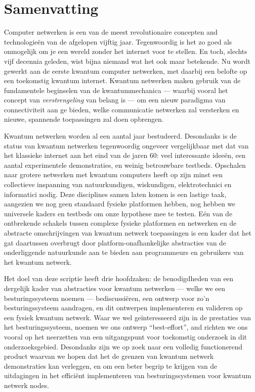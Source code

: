 \chapter*{Samenvatting}

{

Computer netwerken is een van de meest revolutionaire concepten and technologieën van de afgelopen
vijftig jaar. Tegenwoordig is het zo goed als onmogelijk om je een wereld zonder het internet voor
te stellen. En toch, slechts vijf decennia geleden, wist bijna niemand wat het ook maar betekende.
Nu wordt gewerkt aan de eerste kwantum computer netwerken, met daarbij een belofte op een toekomstig
kwantum internet. Kwantum netwerken maken gebruik van de fundamentele beginselen van de
kwantummechanica --- waarbij vooral het concept van \emph{verstrengeling} van belang is --- om een
nieuw paradigma van connectiviteit aan ge bieden, welke communicatie netwerken zal versterken en
nieuwe, spannende toepassingen zal doen opbrengen.

Kwantum netwerken worden al een aantal jaar bestudeerd. Desondanks is de status van kwantum
netwerken tegenwoordig ongeveer vergelijkbaar met dat van het klassieke internet aan het eind van de
jaren 60: veel interessante ideeën, een aantal experimentele demonstraties, en weinig betrouwbare
testbeds. Opschalen naar grotere netwerken met kwantum computers heeft op zijn minst een collectieve
inspanning van natuurkundigen, wiskundigen, elektrotechnici en informatici nodig. Deze disciplines
samen laten komen is een lastige taak, aangezien we nog geen standaard fysieke platformen hebben,
nog hebben we universele kaders en testbeds om onze hypothese mee te testen. Eén van de ontbrekende
schakels tussen complexe fysieke platformen en netwerken en de abstracte omschrijvingen van kwantum
netwerk toepassingen is een kader dat het gat daartussen overbrugt door platform-onafhankelijke
abstracties van de onderliggende natuurkunde aan te bieden aan programmeurs en gebruikers van het
kwantum netwerk.

Het doel van deze scriptie heeft drie hoofdzaken: de benodigdheden van een dergelijk kader van
abstracties voor kwantum netwerken --- welke we een besturingssysteem noemen --- bediscussiëren, een
ontwerp voor zo'n besturingssysteem aandragen, en dit ontwerpen implementeren en valideren op een
fysiek kwantum netwerk. Waar we wel geïnteresseerd zijn in de prestaties van het besturingssysteem,
noemen we ons ontwerp ``best-effort'', and richten we ons vooral op het neerzetten van een
uitgangspunt voor toekomstig onderzoek in dit onderzoeksgebied. Desondanks zijn we op zoek naar een
volledig functionerend product waarvan we hopen dat het de grenzen van kwantum netwerk demonstraties
kan verleggen, en om een beter begrip te krijgen van de uitdagingen in het efficiënt implementeren
van besturingssystemen voor kwantum netwerk nodes.

}

